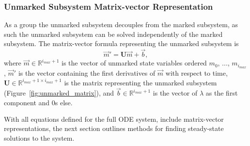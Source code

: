 \documentclass[review]{elsarticle}
\let\bs\boldsymbol
\begin{document}
\subsubsection{Unmarked Subsystem Matrix-vector Representation}
As a group the unmarked subsystem decouples from the marked subsystem, as such the unmarked subsystem can be solved independently of the marked subsystem.  %
The matrix-vector formula representing the unmarked subsystem is \begin{equation}\label{eq:matrix_unmarked}\vec{m}'=\bs{U}\vec{m}+\vec{b},\end{equation} where $\vec{m}\in\mathbb{R}^{i_{max}+1}$ is the vector of unmarked state variables ordered $m_0$, ..., $m_{i_{max}}$, $\vec{m}'$ is the vector containing the first derivatives of $\vec{m}$ with respect to time, $\bs{U}\in\mathbb{R}^{i_{max}+1\times i_{max}+1}$ is the matrix representing the unmarked subsystem (Figure~\ref{fig:unmarked_matrix}), and $\vec{b}\in\mathbb{R}^{i_{max}+1}$ is the vector of $\lambda$ as the first component and 0s else.

With all equations defined for the full ODE system, include matrix-vector representations, the next section outlines methods for finding steady-state solutions to the system.
\end{document}
